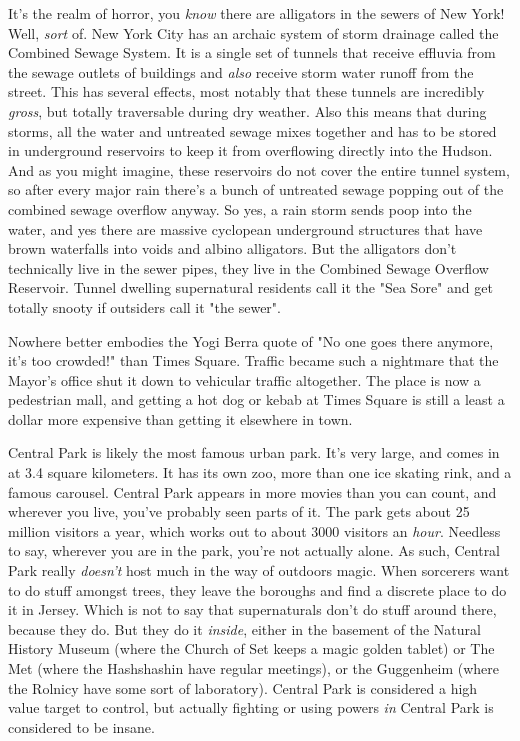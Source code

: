 It's the realm of horror, you \textit{know} there are alligators in the sewers of New York! Well, \textit{sort} of. New York City has an archaic system of storm drainage called the Combined Sewage System. It is a single set of tunnels that receive effluvia from the sewage outlets of buildings and \textit{also} receive storm water runoff from the street. This has several effects, most notably that these tunnels are incredibly \textit{gross}, but totally traversable during dry weather. Also this means that during storms, all the water and untreated sewage mixes together and has to be stored in underground reservoirs to keep it from overflowing directly into the Hudson. And as you might imagine, these reservoirs do not cover the entire tunnel system, so after every major rain there's a bunch of untreated sewage popping out of the combined sewage overflow anyway. So yes, a rain storm sends poop into the water, and yes there are massive cyclopean underground structures that have brown waterfalls into voids and albino alligators. But the alligators don't technically live in the sewer pipes, they live in the Combined Sewage Overflow Reservoir. Tunnel dwelling supernatural residents call it the "Sea Sore" and get totally snooty if outsiders call it "the sewer".

Nowhere better embodies the Yogi Berra quote of "No one goes there anymore, it's too crowded!" than Times Square. Traffic became such a nightmare that the Mayor's office shut it down to vehicular traffic altogether. The place is now a pedestrian mall, and getting a hot dog or kebab at Times Square is still a least a dollar more expensive than getting it elsewhere in town.

Central Park is likely the most famous urban park. It's very large, and comes in at 3.4 square kilometers. It has its own zoo, more than one ice skating rink, and a famous carousel. Central Park appears in more movies than you can count, and wherever you live, you've probably seen parts of it. The park gets about 25 million visitors a year, which works out to about 3000 visitors an \textit{hour}. Needless to say, wherever you are in the park, you're not actually alone. As such, Central Park really \textit{doesn't} host much in the way of outdoors magic. When sorcerers want to do stuff amongst trees, they leave the boroughs and find a discrete place to do it in Jersey. Which is not to say that supernaturals don't do stuff around there, because they do. But they do it \textit{inside}, either in the basement of the Natural History Museum (where the Church of Set keeps a magic golden tablet) or The Met (where the Hashshashin have regular meetings), or the Guggenheim (where the Rolnicy have some sort of laboratory). Central Park is considered a high value target to control, but actually fighting or using powers \textit{in} Central Park is considered to be insane. 

